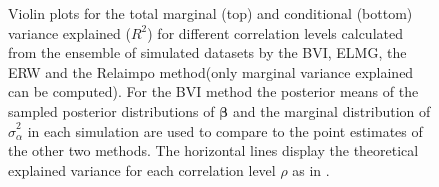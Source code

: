 \begin{figure}[H]
  \centering
  \hfill
  \caption[Marginal and conditional $R^2$ in Gaussian LMM]{Violin plots for the total marginal (top) and conditional (bottom) variance explained ($R^2$) for different correlation levels calculated from the ensemble of simulated datasets by the BVI, ELMG, the ERW and the Relaimpo method(only marginal variance explained can be computed). For the BVI method the posterior means of the sampled posterior distributions of $\boldsymbol{\beta}$ and the marginal distribution of $\hat{\sigma}^2_{\alpha}$ in each simulation are used to compare to the point estimates of the other two methods. The horizontal lines display the theoretical explained variance for each correlation level $\rho$ as in .}
  \label{fig:total_variance}
\end{figure}

